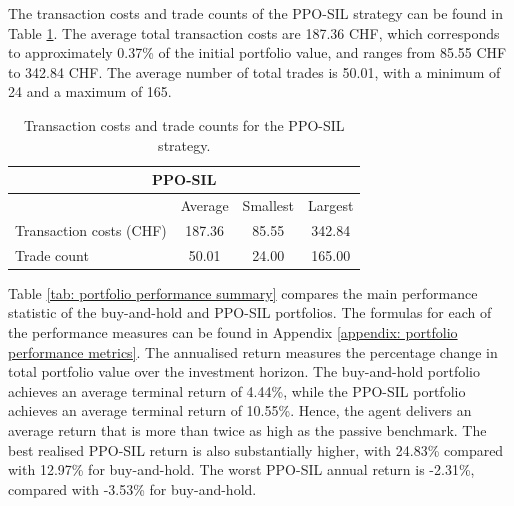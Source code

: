 The transaction costs and trade counts of the PPO-SIL strategy can be found in Table \ref{tab: ppo sil transactions and costs}. The average total transaction costs are 187.36 CHF, which corresponds to approximately 0.37\% of the initial portfolio value, and ranges from 85.55 CHF to 342.84 CHF. The average number of total trades is 50.01, with a minimum of 24 and a maximum of 165. 
\begin{table}[!htbp]
    \centering
    \begin{tabular}{@{}lccc@{}}
        \toprule
        \multicolumn{4}{c}{PPO-SIL} \\
        \midrule
        & Average & Smallest & Largest \\
        \midrule
        Transaction costs (CHF) & 187.36 & 85.55 & 342.84 \\
        Trade count & 50.01 & 24.00 & 165.00\\
        \bottomrule
    \end{tabular}
    \caption{Transaction costs and trade counts for the PPO-SIL strategy.}
    \label{tab: ppo sil transactions and costs}
\end{table}
Table \ref{tab: portfolio performance summary} compares the main performance statistic of the buy-and-hold and PPO-SIL portfolios. The formulas for each of the performance measures can be found in Appendix \ref{appendix: portfolio performance metrics}. The annualised return measures the percentage change in total portfolio value over the investment horizon. The buy-and-hold portfolio achieves an average terminal return of 4.44\%, while the PPO-SIL portfolio achieves an average terminal return of 10.55\%. Hence, the agent delivers an average return that is more than twice as high as the passive benchmark. The best realised PPO-SIL return is also substantially higher, with 24.83\% compared with 12.97\% for buy-and-hold. The worst PPO-SIL annual return is -2.31\%, compared with -3.53\% for buy-and-hold. 
